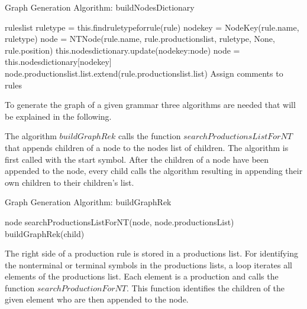 \begin{algorithm}[H]
\caption{Graph Generation Algorithm: buildNodesDictionary}\label{alg:buildNodesDictionary}
\begin{algorithmic}[1] 
\Require rules\textunderscore list
		\State rule\textunderscore type = this.find\textunderscore rule\textunderscore type\textunderscore for\textunderscore rule(rule)
		\State node\textunderscore key = Node\textunderscore Key(rule.name, rule\textunderscore type)
			\State node = NTNode(rule.name, rule.productions\textunderscore list, rule\textunderscore type, None, rule.position)
			\State this.nodes\textunderscore dictionary.update({node\textunderscore key:node})
		\Else
			\State node = this.nodes\textunderscore dictionary[node\textunderscore key]
			\State node.productions\textunderscore list.list.extend(rule.productions\textunderscore list.list)
		\EndIf
	\EndIf
\EndFor
\State Assign comments to rules
\end{algorithmic}
\end{algorithm}

To generate the graph of a given grammar three algorithms are needed that will be explained in the following.

The algorithm $buildGraphRek$ calls the function $searchProductionsListForNT$ that appends children of a node to the nodes list of children.
The algorithm is first called with the start symbol.
After the children of a node have been appended to the node, every child calls the algorithm resulting in appending their own children to their children's list.

\begin{algorithm}[H]
\caption{Graph Generation Algorithm: buildGraphRek}
\begin{algorithmic}[1] 
\Require node
\State searchProductionsListForNT(node, node.productionsList)
		\State buildGraphRek(child)
	\EndFor
\EndIf
\end{algorithmic}
\end{algorithm}

The right side of a production rule is stored in a productions list.
For identifying the nonterminal or terminal symbols in the productions lists, a loop iterates all elements of the productions list.
Each element is a production and calls the function $searchProductionForNT$.
This function identifies the children of the given element who are then appended to the node.

